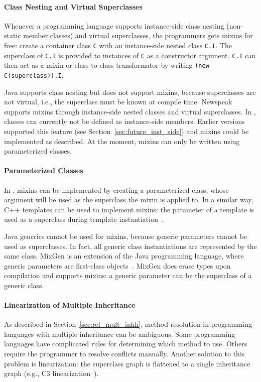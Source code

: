 \paragraph{Class Nesting and Virtual Superclasses}
Whenever a programming language supports instance-side class nesting (non-static member classes) and virtual superclasses, the programmers gets mixins for free: create a container class \texttt{C} with an instance-side nested class \texttt{C.I}. The superclass of \texttt{C.I} is provided to instances of \texttt{C} as a constructor argument. \texttt{C.I} can then act as a mixin or class-to-class transformator by writing \texttt{(new C(superclass)).I}.

Java supports class nesting but does not support mixins, because superclasses are not virtual, i.e., the superclass must be known at compile time. Newspeak supports mixins through instance-side nested classes and virtual superclasses. In \msname, classes can currently not be defined as instance-side members. Earlier versions \msname supported this feature (see Section~\ref{sec:future_inst_side}) and mixins could be implemented as described. At the moment, mixins can only be written using parameterized classes. 

\paragraph{Parameterized Classes}
In \msname, mixins can be implemented by creating a parameterized class, whose argument will be used as the superclass the mixin is applied to. In a similar way, C++ templates can be used to implement mixins: the parameter of a template is used as a superclass during template instantiation~\cite{mixinbasedcpp, nestedinterfaces}. 

Java generics cannot be used for mixins, because generic parameters cannot be used as superclasses. In fact, all generic class instantiations are represented by the same class. MixGen is an extension of the Java programming language, where generic parameters are first-class objects~\cite{Allen:2003:FAG:949305.949316}. MixGen does erase types upon compilation and supports mixins: a generic parameter can be the superclass of a generic class.

\paragraph{Linearization of Multiple Inheritance}
As described in Section~\ref{sec:rel_mult_inhh}, method resolution in programming languages with multiple inheritance can be ambiguous. Some programming languages have complicated rules for determining which method to use. Others require the programmer to resolve conflicts manually. Another solution to this problem is linearization: the superclass graph is flattened to a single inheritance graph (e.g., C3 linearization~\cite{pythonmro23}).


